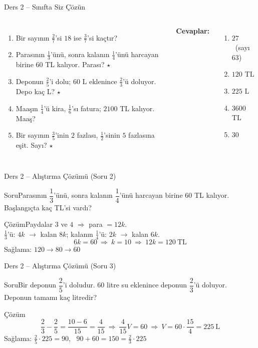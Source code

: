 \documentclass[aspectratio=169,11pt]{beamer}
\newcommand{\soru}[3]{%
\begin{frame}{#1}
  \begin{block}{Soru}\large #2\end{block}
  \pause
  \begin{exampleblock}{Çözüm}\large #3\end{exampleblock}
\end{frame}}
\begin{document}
\begin{frame}{Ders 2 -- Sınıfta Siz Çözün}
\begin{columns}[t]
\begin{enumerate}
\item Bir sayının \(\frac{2}{7}\)'si \(18\) ise \(\frac{3}{7}\)'si kaçtır?
\item Parasının \(\frac{1}{3}\)'ünü, sonra kalanın \(\frac{1}{4}\)'ünü harcayan birine \(60\) TL kalıyor. Parası? \(\star\)
\item Deponun \(\frac{2}{5}\)'i dolu; \(60\) L eklenince \(\frac{2}{3}\)'ü doluyor. Depo kaç L? \(\star\)
\item Maaşın \(\frac{1}{4}\)'ü kira, \(\frac{1}{6}\)'sı fatura; \(2100\) TL kalıyor. Maaş?
\item Bir sayının \(\frac{3}{5}\)'inin \(2\) fazlası, \(\frac{1}{2}\)'sinin \(5\) fazlasına eşit. Sayı? \(\star\)
\end{enumerate}
\pause
\textbf{Cevaplar:}
\begin{enumerate}
\item \(27\) \ (sayı \(63\))
\item \(120\) TL
\item \(225\) L
\item \(3600\) TL
\item \(30\)
\end{enumerate}
\end{columns}
\vspace{4pt}{\footnotesize \(\star\) işaretli soruların adım adım çözümü sonraki slaytlardadır.}
\end{frame}

\soru{Ders 2 -- Alıştırma Çözümü (Soru 2)}
{Parasının \(\dfrac{1}{3}\)'ünü, sonra kalanın \(\dfrac{1}{4}\)'ünü harcayan birine \(60\) TL kalıyor. Başlangıçta kaç TL'si vardı?}
{Paydalar \(3\) ve \(4\) \(\Rightarrow\) para \(=12k\).\\[2pt]
\(\frac{1}{3}\)'ü: \(4k\) \(\to\) kalan \(8k\); \quad kalanın \(\frac{1}{4}\)'ü: \(2k\) \(\to\) kalan \(6k\).
\[6k=60\ \Rightarrow\ k=10\ \Rightarrow\ 12k=120\ \text{TL}\]
Sağlama: \(120\to 80\to 60\) \checkmark}

\soru{Ders 2 -- Alıştırma Çözümü (Soru 3)}
{Bir deponun \(\dfrac{2}{5}\)'i doludur. \(60\) litre su eklenince deponun \(\dfrac{2}{3}\)'ü doluyor. Deponun tamamı kaç litredir?}
{\[\frac{2}{3}-\frac{2}{5}=\frac{10-6}{15}=\frac{4}{15}\ \Rightarrow\ \frac{4}{15}V=60\ \Rightarrow\ V=60\cdot\frac{15}{4}=225\ \text{L}\]
Sağlama: \(\frac{2}{5}\cdot 225=90\), \ \(90+60=150=\frac{2}{3}\cdot 225\) \checkmark}
\end{document}

